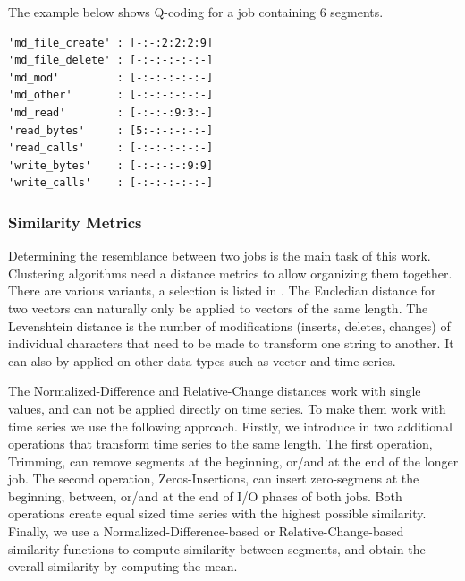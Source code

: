 \documentclass{jhps}
\begin{document}
The example below shows Q-coding for a job containing 6 segments.

\begin{lstlisting}[caption={Q-coding of a six segments long job.}]
'md_file_create' : [-:-:2:2:2:9]
'md_file_delete' : [-:-:-:-:-:-]
'md_mod'         : [-:-:-:-:-:-]
'md_other'       : [-:-:-:-:-:-]
'md_read'        : [-:-:-:9:3:-]
'read_bytes'     : [5:-:-:-:-:-]
'read_calls'     : [-:-:-:-:-:-]
'write_bytes'    : [-:-:-:-:9:9]
'write_calls'    : [-:-:-:-:-:-]
\end{lstlisting}

\subsubsection{Similarity Metrics}
Determining the resemblance between two jobs is the main task of this work.
Clustering algorithms need a distance metrics to allow organizing them together.
There are various variants, a selection is listed in .
The Eucledian distance for two vectors can naturally only be applied to vectors of the same length.
The Levenshtein distance is the number of modifications (inserts, deletes, changes) of individual characters that need to be made to transform one string to another.
It can also by applied on other data types such as vector and time series.

The Normalized-Difference and Relative-Change distances work with single values, and can not be applied directly on time series.
To make them work with time series we use the following approach.
Firstly, we introduce in  two additional operations that transform time series to the same length.
The first operation, Trimming, can remove segments at the beginning, or/and at the end of the longer job.
The second operation, Zeros-Insertions, can insert zero-segmens at the beginning, between, or/and at the end of I/O phases of both jobs.
Both operations create equal sized time series with the highest possible similarity.
Finally, we use a Normalized-Difference-based or Relative-Change-based similarity functions to compute similarity between segments, and obtain the overall similarity by computing the mean.
\end{document}
